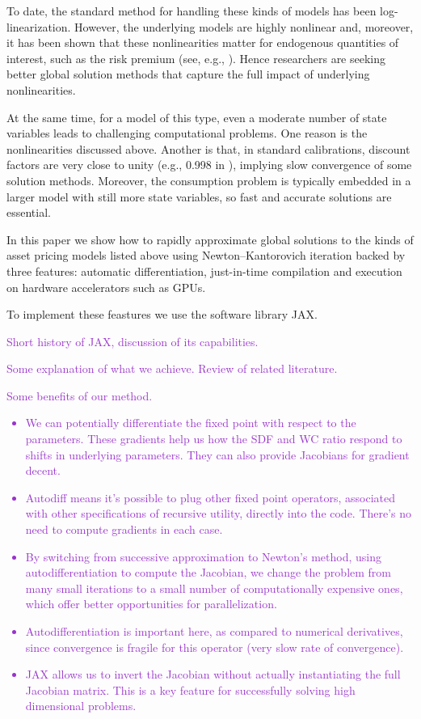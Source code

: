 \documentclass[12pt, reqno]{amsart}
\newcommand{\1}{\mathbbm 1}
\theoremstyle{plain}
\theoremstyle{definition}
\begin{document}
To date, the standard method for handling these kinds of models has been
log-linearization.  However, the underlying models are highly nonlinear and,
moreover, it has been shown that these nonlinearities matter for endogenous
quantities of interest, such as the risk premium (see, e.g.,
\cite{pohl2018higher}).  Hence researchers are seeking better global solution
methods that capture the full impact of underlying nonlinearities.

At the same time, for a model of this type, even a moderate number of state
variables leads to challenging computational problems.  One reason is the
nonlinearities discussed above.  Another is that, in standard calibrations,
discount factors are very close to unity (e.g., 0.998 in
\cite{bansal2004risks}), implying slow convergence of some solution methods.
Moreover, the consumption problem is typically embedded in a larger model with
still more state variables, so fast and accurate solutions are essential.  

In this paper we show how to rapidly approximate global solutions to the kinds
of asset pricing models listed above using Newton--Kantorovich iteration backed
by three features: automatic differentiation, just-in-time compilation and 
execution on hardware accelerators such as GPUs. 

To implement these feastures we use the software library JAX. 

\textcolor{DarkOrchid}{Short history of JAX, discussion of its capabilities.}

\textcolor{DarkOrchid}{Some explanation of what we achieve. Review of related
literature.}

\textcolor{DarkOrchid}{Some benefits of our method. 
    \begin{itemize}
        \item We can potentially differentiate the fixed point with respect to the
            parameters. These gradients help us how the SDF and WC ratio respond
            to shifts in underlying parameters.  They can also provide Jacobians
            for gradient decent.
        \item Autodiff means it's possible to plug other fixed point operators, associated with
            other specifications of recursive utility, directly into the code.
            There's no need to compute gradients in each case.
        \item By switching from successive approximation to Newton's method, using
            autodifferentiation to compute the Jacobian, we change the problem
            from many small iterations to a small number of computationally
            expensive ones, which offer better opportunities for parallelization. 
        \item Autodifferentiation is important here, as compared to numerical
            derivatives, since convergence is fragile for this operator (very slow
            rate of convergence).
        \item JAX allows us to invert the Jacobian without actually instantiating
            the full Jacobian matrix.   This is a key feature for successfully
            solving high dimensional problems. 
    \end{itemize}
}
\end{document}
